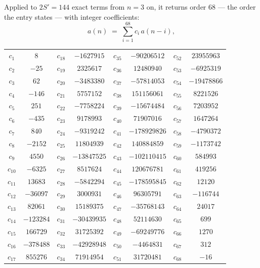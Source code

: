 \documentclass[11pt,a4paper]{article}
\theoremstyle{plain}
\theoremstyle{definition}
\begin{document}
Applied to $2S'=144$ exact terms from $n=3$ on, it returns order $68$ --- the
order the entry states --- with integer coefficients:
\[
a(n)\;=\;\sum_{i=1}^{68}c_i\,a(n-i),
\]
\begin{center}\small
\begin{tabular}{cccccccc}
$c_{1}$ & $8$ & $c_{18}$ & $-1627915$ & $c_{35}$ & $-90206512$ & $c_{52}$ & $23955963$ \\
$c_{2}$ & $-25$ & $c_{19}$ & $2325617$ & $c_{36}$ & $12480940$ & $c_{53}$ & $-6925319$ \\
$c_{3}$ & $62$ & $c_{20}$ & $-3483380$ & $c_{37}$ & $-57814053$ & $c_{54}$ & $-19478866$ \\
$c_{4}$ & $-146$ & $c_{21}$ & $5757152$ & $c_{38}$ & $151156061$ & $c_{55}$ & $8221526$ \\
$c_{5}$ & $251$ & $c_{22}$ & $-7758224$ & $c_{39}$ & $-15674484$ & $c_{56}$ & $7203952$ \\
$c_{6}$ & $-435$ & $c_{23}$ & $9178993$ & $c_{40}$ & $71907016$ & $c_{57}$ & $1647264$ \\
$c_{7}$ & $840$ & $c_{24}$ & $-9319242$ & $c_{41}$ & $-178929826$ & $c_{58}$ & $-4790372$ \\
$c_{8}$ & $-2152$ & $c_{25}$ & $11804939$ & $c_{42}$ & $140884859$ & $c_{59}$ & $-1173742$ \\
$c_{9}$ & $4550$ & $c_{26}$ & $-13847525$ & $c_{43}$ & $-102110415$ & $c_{60}$ & $584993$ \\
$c_{10}$ & $-6325$ & $c_{27}$ & $8517624$ & $c_{44}$ & $120676781$ & $c_{61}$ & $419256$ \\
$c_{11}$ & $13683$ & $c_{28}$ & $-5842294$ & $c_{45}$ & $-178595845$ & $c_{62}$ & $12120$ \\
$c_{12}$ & $-36097$ & $c_{29}$ & $3000931$ & $c_{46}$ & $96305791$ & $c_{63}$ & $-116744$ \\
$c_{13}$ & $82061$ & $c_{30}$ & $15189375$ & $c_{47}$ & $-35768143$ & $c_{64}$ & $24017$ \\
$c_{14}$ & $-123284$ & $c_{31}$ & $-30439935$ & $c_{48}$ & $52114630$ & $c_{65}$ & $699$ \\
$c_{15}$ & $166729$ & $c_{32}$ & $31725392$ & $c_{49}$ & $-69249776$ & $c_{66}$ & $1270$ \\
$c_{16}$ & $-378488$ & $c_{33}$ & $-42928948$ & $c_{50}$ & $-4464831$ & $c_{67}$ & $312$ \\
$c_{17}$ & $855276$ & $c_{34}$ & $71914954$ & $c_{51}$ & $31720481$ & $c_{68}$ & $-16$ \\
\end{tabular}
\end{center}
\end{document}
